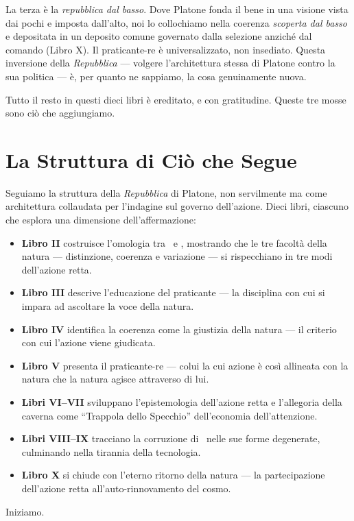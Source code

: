 La terza \`e la \emph{repubblica dal basso}. Dove Platone fonda il bene in una
visione vista dai pochi e imposta dall'alto, noi lo collochiamo nella coerenza
\emph{scoperta dal basso} e depositata in un deposito comune governato dalla
selezione anzich\'e dal comando (Libro X). Il praticante-re \`e universalizzato,
non insediato. Questa inversione della \emph{Repubblica} --- volgere l'architettura
stessa di Platone contro la sua politica --- \`e, per quanto ne sappiamo, la cosa
genuinamente nuova.

Tutto il resto in questi dieci libri \`e ereditato, e con gratitudine. Queste tre
mosse sono ci\`o che aggiungiamo.

\section{La Struttura di Ci\`o che Segue}

Seguiamo la struttura della \emph{Repubblica} di Platone, non servilmente
ma come architettura collaudata per l'indagine sul governo dell'azione.
Dieci libri, ciascuno che esplora una dimensione dell'affermazione:

\begin{itemize}
\item \textbf{Libro II} costruisce l'omologia tra \physis\ e \praxis,
  mostrando che le tre facolt\`a della natura --- distinzione, coerenza e
  variazione --- si rispecchiano in tre modi dell'azione retta.
\item \textbf{Libro III} descrive l'educazione del praticante --- la
  disciplina con cui si impara ad ascoltare la voce della natura.
\item \textbf{Libro IV} identifica la coerenza come la giustizia della
  natura --- il criterio con cui l'azione viene giudicata.
\item \textbf{Libro V} presenta il praticante-re --- colui la cui azione
  \`e cos\`i allineata con la natura che la natura agisce attraverso di lui.
\item \textbf{Libri VI--VII} sviluppano l'epistemologia dell'azione retta
  e l'allegoria della caverna come ``Trappola dello Specchio''
  dell'economia dell'attenzione.
\item \textbf{Libri VIII--IX} tracciano la corruzione di \praxis\ nelle
  sue forme degenerate, culminando nella tirannia della tecnologia.
\item \textbf{Libro X} si chiude con l'eterno ritorno della natura ---
  la partecipazione dell'azione retta all'auto-rinnovamento del cosmo.
\end{itemize}

Iniziamo.
